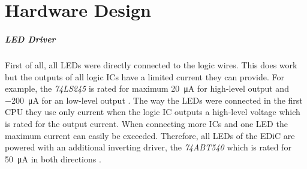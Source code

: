 \chapter{Hardware Design}\label{cha:hardware}
\paragraph{LED Driver}
First of all, all \glspl{LED} were directly connected to the logic wires.
This does work but the outputs of all logic \glspl{IC} have a limited current they can provide.
For example, the \emph{74LS245} is rated for maximum \qty{20}{\uA} for high-level output and \qty{-200}{\micro\ampere} for an low-level output \cite{74ls245}.
The way the \glspl{LED} were connected in the first \gls{CPU} they use only current when the logic \gls{IC} outputs a high-level voltage which is rated for  the output current.
When connecting more \glspl{IC} and one \gls{LED} the maximum current can easily be exceeded.
Therefore, all \glspl{LED} of the \gls{EDiC} are powered with an additional inverting driver, the \emph{74ABT540} which is rated for \qty{50}{\uA} in both directions \cite{74abt540}.
